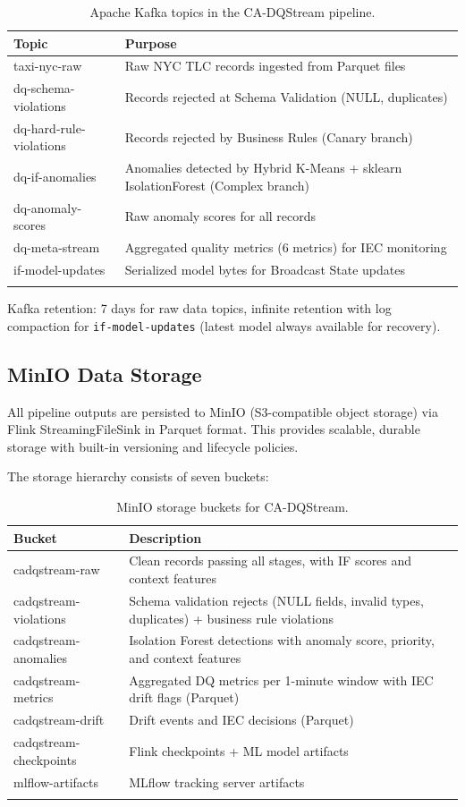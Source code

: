 \begin{longtable}{|m{4cm}|m{9cm}|}
\hline
\textbf{Topic} & \textbf{Purpose} \\ \hline
taxi-nyc-raw & Raw NYC TLC records ingested from Parquet files \\ \hline
dq-schema-violations & Records rejected at Schema Validation (NULL, duplicates) \\ \hline
dq-hard-rule-violations & Records rejected by Business Rules (Canary branch) \\ \hline
dq-if-anomalies & Anomalies detected by Hybrid K-Means + sklearn IsolationForest (Complex branch) \\ \hline
dq-anomaly-scores & Raw anomaly scores for all records \\ \hline
dq-meta-stream & Aggregated quality metrics (6 metrics) for IEC monitoring \\ \hline
if-model-updates & Serialized model bytes for Broadcast State updates \\ \hline
\caption{Apache Kafka topics in the CA-DQStream pipeline.}
\label{tab:kafka_topics}
\end{longtable}

Kafka retention: 7 days for raw data topics, infinite retention with log compaction for \texttt{if-model-updates} (latest model always available for recovery).

\subsection{MinIO Data Storage}

All pipeline outputs are persisted to MinIO (S3-compatible object storage) via Flink StreamingFileSink in Parquet format. This provides scalable, durable storage with built-in versioning and lifecycle policies.

The storage hierarchy consists of seven buckets:

\begin{longtable}{|m{4cm}|m{9.5cm}|}
\hline
\textbf{Bucket} & \textbf{Description} \\ \hline
cadqstream-raw & Clean records passing all stages, with IF scores and context features \\ \hline
cadqstream-violations & Schema validation rejects (NULL fields, invalid types, duplicates) + business rule violations \\ \hline
cadqstream-anomalies & Isolation Forest detections with anomaly score, priority, and context features \\ \hline
cadqstream-metrics & Aggregated DQ metrics per 1-minute window with IEC drift flags (Parquet) \\ \hline
cadqstream-drift & Drift events and IEC decisions (Parquet) \\ \hline
cadqstream-checkpoints & Flink checkpoints + ML model artifacts \\ \hline
mlflow-artifacts & MLflow tracking server artifacts \\
\hline
\caption{MinIO storage buckets for CA-DQStream.}
\label{tab:minio_schema}
\end{longtable}

